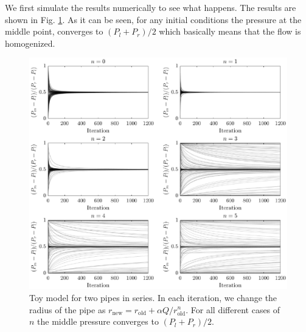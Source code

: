 We first simulate the results numerically to see what happens. The
results are shown in Fig. \ref{toy-series}. As it can be seen, for any
initial conditions the pressure at the middle point, converges to
$(P_l + P_{r})/2$ which basically means that the flow is homogenized.
%
\begin{figure}[!h]
  \centerline{\includegraphics[width=1\textwidth]{./Figs/toy-model-series}}
\caption{Toy model for two pipes in series. In each iteration, we
  change the radius of the pipe as $r_{\text{new}} = r_{\text{old}} +
  \alpha Q/r_{\text{old}}^n$. For all different cases of $n$ the
  middle pressure converges to $(P_l + P_r)/2$.}
\label{toy-series}
\end{figure}  
%


